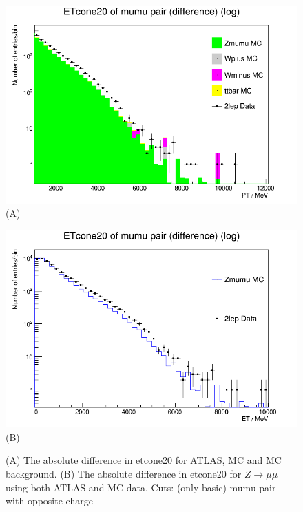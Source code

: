 \begin{figure}[h!]
    \centering
    \begin{minipage}{0.5\textwidth}
        \centering
        \includegraphics[width=\linewidth]{plots/27-02-2021/All-Stack-Zmumu-fast_etcone-difference_log-y_(basic-cuts_2lep=mumu_opp-c)_27-02-21_10-57.png}
        (A)
    \end{minipage}\hfill
    \begin{minipage}{0.5\textwidth}
        \centering
        \includegraphics[width=\linewidth]{plots/27-02-2021/2-Stack-Zmumu-fast_etcone-difference_log-y_(basic-cuts_2lep=mumu_opp-c)_27-02-21_10-57.png}
        (B)
    \end{minipage}
    \caption{(A) The absolute difference in etcone20 for ATLAS, MC and MC background. (B) The absolute difference in etcone20 for $Z \rightarrow \mu\mu$ using both ATLAS and MC data.  Cuts: (only basic) mumu pair with opposite charge}
    \label{fig:Stack-Zmumu-fast_etcone-difference_log-y_(basic-cuts_2lep=mumu_opp-c)_27-02-21_10-57}
\end{figure}


